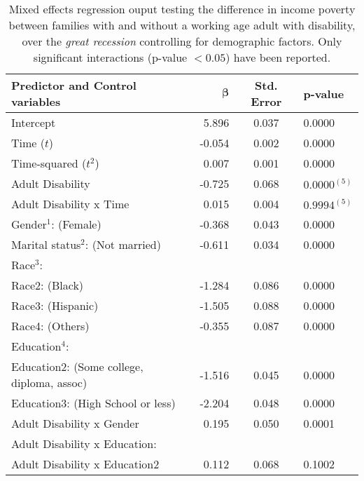 \begin{table}[H]
\centering
\caption{Mixed effects regression ouput testing the difference in income poverty between families with and without a working age adult with disability, over the {\emph{great recession}} controlling for demographic factors. Only significant interactions (p-value $< 0.05$) have been reported.} 
\begin{threeparttable}
\begin{tabular}{lrcl}
  \hline
  {\bf{Predictor and Control variables}} & $\mathbf{\beta}$ & {\bf{Std. Error}} & {\bf{p-value}} \\ 
  \hline
  Intercept 						& 5.896 	& 0.037 & 0.0000 \\ 
  Time ($t$) 						& -0.054 	& 0.002 & 0.0000 \\ 
  Time-squared ($t^2$) 					& 0.007 	& 0.001 & 0.0000 \\ 
  Adult Disability 					& -0.725 	& 0.068 & $0.0000^{(5)}$ \\ 
  Adult Disability x Time 				& 0.015		& 0.004 & $0.9994^{(5)}$ \\ 
  Gender$^1$: (Female) 					& -0.368 	& 0.043 & 0.0000 \\ 
  Marital status$^2$: (Not married) 			& -0.611 	& 0.034 & 0.0000 \\ 
Race$^3$: & & & \\
  \hspace{5pt} Race2: (Black) 				& -1.284 	& 0.086 & 0.0000 \\ 
  \hspace{5pt} Race3: (Hispanic) 			& -1.505 	& 0.088 & 0.0000 \\ 
  \hspace{5pt}   Race4: (Others) 			& -0.355 	& 0.087 & 0.0000 \\ 
Education$^4$: & & & \\
  \hspace{5pt}   Education2: (Some college, diploma, assoc) & -1.516 	& 0.045 & 0.0000 \\ 
  \hspace{5pt}   Education3: (High School or less) 	& -2.204 	& 0.048 & 0.0000 \\ 
  Adult Disability x Gender 				& 0.195		& 0.050 & 0.0001 \\ 
Adult Disability x Education: & & & \\
  \hspace{5pt}   Adult Disability x Education2 		& 0.112		& 0.068 & 0.1002 \\ 

\end{tabular}
\end{threeparttable}
\end{table}

